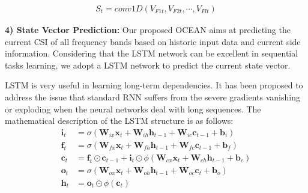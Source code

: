 \documentclass[10pt,conference,letterpaper]{IEEEtran}
\begin{document}

\begin{eqnarray}
S_t  = conv1D(V_{F1t} , V_{F2t} , \cdots, V_{Flt} )
\end{eqnarray}

\textbf{4) State Vector Prediction: }Our proposed OCEAN aims at predicting the current CSI of all frequency bands based on historic input data and current side information. Considering that the LSTM network can be excellent in sequential tasks learning, we adopt a LSTM network to predict the current state vector.

LSTM is very useful in learning long-term dependencies. It has been proposed to address the issue that standard RNN suffers from the severe gradients vanishing or exploding when the neural networks deal with long sequences. The mathematical description of the LSTM structure is as follows:
\begin{align}
{\mathbf{i}_t} &= \sigma \left( {{\mathbf{W}_{ix}}{\mathbf{x}_t} + {\mathbf{W}_{ih}}{\mathbf{h}_{t - 1}} + {\mathbf{W}_{ic}}{\mathbf{c}_{t - 1}} + {\mathbf{b}_i}} \right)\\
{\mathbf{f}_t} &= \sigma \left( {{\mathbf{W}_{fx}}{\mathbf{x}_t} + {\mathbf{W}_{fh}}{\mathbf{h}_{t - 1}} + {\mathbf{W}_{fc}}{\mathbf{c}_{t - 1}} + {\mathbf{b}_f}} \right)\\
{\mathbf{c}_t} &= {\mathbf{f}_t} \odot {\mathbf{c}_{t - 1}} + {\mathbf{i}_t} \odot \phi \left( {{\mathbf{W}_{cx}}{\mathbf{x}_t} + {\mathbf{W}_{ch}}{\mathbf{h}_{t - 1}} + {\mathbf{b}_c}} \right)\\
{\mathbf{o}_t} &= \sigma \left( {{\mathbf{W}_{ox}}{\mathbf{x}_t} + {\mathbf{W}_{oh}}{\mathbf{h}_{t - 1}} + {\mathbf{W}_{oc}}{\mathbf{c}_t} + {\mathbf{b}_o}} \right)\\
{\mathbf{h}_t} &= {\mathbf{o}_t} \odot \phi \left( {{\mathbf{c}_t}} \right)
\end{align}
\end{document}
